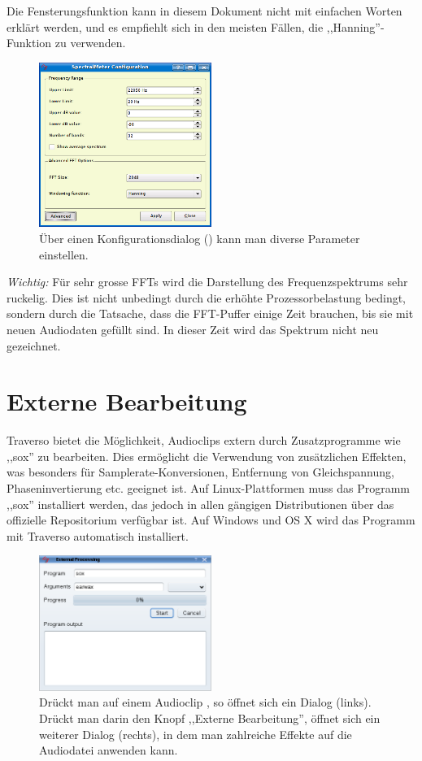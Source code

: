 Die Fensterungsfunktion kann in diesem Dokument nicht mit einfachen Worten erklärt werden, und es empfiehlt sich in den meisten Fällen, die ,,Hanning''-Funktion zu verwenden.

\begin{figure}
	\centering
	\includegraphics[width=0.5\textwidth]{../images/fft3}
	\caption{Über einen Konfigurationsdialog () kann man diverse Parameter einstellen.}
	\label{fig_fft3}
\end{figure}

\emph{Wichtig:} Für sehr grosse FFTs wird die Darstellung des Frequenzspektrums sehr ruckelig. Dies ist nicht unbedingt durch die erhöhte Prozessorbelastung bedingt, sondern durch die Tatsache, dass die FFT-Puffer einige Zeit brauchen, bis sie mit neuen Audiodaten gefüllt sind. In dieser Zeit wird das Spektrum nicht neu gezeichnet.

\section{Externe Bearbeitung}
Traverso bietet die Möglichkeit, Audioclips extern durch Zusatzprogramme wie ,,sox'' \cite{sox} zu bearbeiten. Dies ermöglicht die Verwendung von zusätzlichen Effekten, was besonders für Samplerate-Konversionen, Entfernung von Gleichspannung, Phaseninvertierung etc. geeignet ist. Auf Linux-Plattformen muss das Programm ,,sox'' installiert werden, das jedoch in allen gängigen Distributionen über das offizielle Repositorium verfügbar ist. Auf Windows und OS X wird das Programm mit Traverso automatisch installiert.

\begin{figure}
	\centering
	\includegraphics[width=0.5\textwidth]{../images/external00}
	\caption{Drückt man auf einem Audioclip , so öffnet sich ein Dialog (links). Drückt man darin den Knopf ,,Externe Bearbeitung'', öffnet sich ein weiterer Dialog (rechts), in dem man zahlreiche Effekte auf die Audiodatei anwenden kann.}
	\label{fig_external01}
\end{figure}

